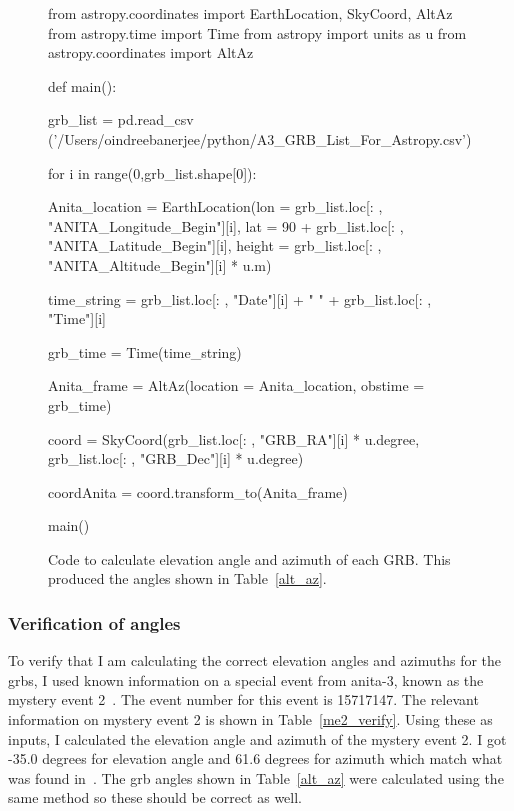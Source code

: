 \begin{figure}
\centering
\begin{verbbox}
from astropy.coordinates import EarthLocation, SkyCoord, AltAz
from astropy.time import Time
from astropy import units as u
from astropy.coordinates import AltAz

def main():

  grb_list = pd.read_csv
  ('/Users/oindreebanerjee/python/A3_GRB_List_For_Astropy.csv')

  for i in range(0,grb_list.shape[0]):
  
    Anita_location = EarthLocation(lon = grb_list.loc[: ,
    "ANITA_Longitude_Begin"][i], lat = 90 + grb_list.loc[: ,
    "ANITA_Latitude_Begin"][i], height = grb_list.loc[: ,
    "ANITA_Altitude_Begin"][i] * u.m)

    time_string = grb_list.loc[: , "Date"][i] + " " 
    + grb_list.loc[: , "Time"][i]

    grb_time = Time(time_string)

    Anita_frame = AltAz(location = Anita_location, 
    obstime = grb_time)

    coord = SkyCoord(grb_list.loc[: , "GRB_RA"][i] * u.degree,
    grb_list.loc[: , "GRB_Dec"][i] * u.degree)

    coordAnita = coord.transform_to(Anita_frame)
    
main()
\end{verbbox}
\fbox{\theverbbox}
\caption{Code to calculate elevation angle and azimuth of each GRB. This produced the angles shown in Table~\ref{alt_az}.}
\label{alt_az_code}
\end{figure}


\subsubsection{Verification of angles}

To verify that I am calculating the correct elevation angles and azimuths for the \gls{grbs}, I used known information on a special event from \gls{anita}-3, known as the mystery event 2~\cite{me2}. The event number for this event is 15717147. 
The relevant information on mystery event 2 is shown in Table~\ref{me2_verify}. Using these as inputs, I calculated the elevation angle and azimuth of the mystery event 2. I got -35.0 degrees for elevation angle and 61.6 degrees for azimuth which match what was found in~\cite{me2}. The \gls{grb} angles shown in Table~\ref{alt_az} were calculated using the same method so these should be correct as well. 

